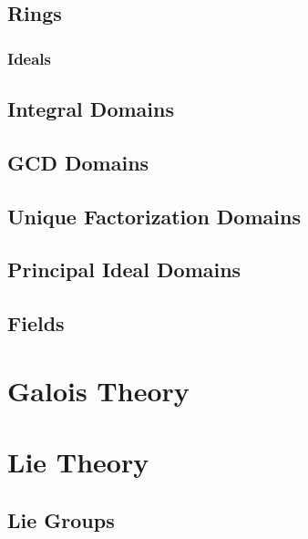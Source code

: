 \documentclass[12pt, english]{book}
\begin{document}
	
	\chapter{Rings} \label{Rings Chapter - Abstract Algebra}
	
	\section{Ideals} \label{Ideals Section - Abstract Algebra}
	
	\chapter{Integral Domains} \label{Integral Domains Chapter - Abstract Algebra}
	
	\chapter{GCD Domains} \label{GCD Domains Chapter - Abstract Algebra}
	
	\chapter{Unique Factorization Domains} \label{Unique Factorization Domains Chapter - Abstract Algebra}
	
	\chapter{Principal Ideal Domains} \label{Principal Ideal Domains Chapter - Abstract Algebra}
	
	\chapter{Fields} \label{Fields Chapter - Abstract Algebra}
	
	
	\part{Galois Theory} \label{Galois Theory Part}
	
	\part{Lie Theory} \label{Lie Algebra Part}
	
	\chapter{Lie Groups}
	
\end{document}
